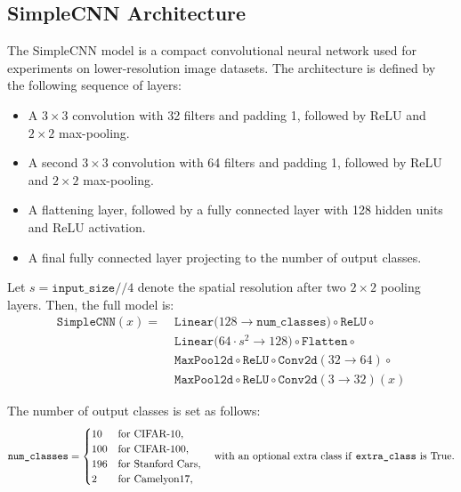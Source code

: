 \subsection{SimpleCNN Architecture}
\label{app:simplecnn}

\noindent
The SimpleCNN model is a compact convolutional neural network used for experiments on lower-resolution image datasets. The architecture is defined by the following sequence of layers:
\begin{itemize}
  \item A $3 \times 3$ convolution with 32 filters and padding 1, followed by ReLU and $2 \times 2$ max-pooling.
  \item A second $3 \times 3$ convolution with 64 filters and padding 1, followed by ReLU and $2 \times 2$ max-pooling.
  \item A flattening layer, followed by a fully connected layer with 128 hidden units and ReLU activation.
  \item A final fully connected layer projecting to the number of output classes.
\end{itemize}

Let \( s = \texttt{input\_size} // 4 \) denote the spatial resolution after two $2\times2$ pooling layers. Then, the full model is:
\[
\begin{aligned}
\texttt{SimpleCNN}(x) =\;&
\texttt{Linear}\big(128 \to \texttt{num\_classes}\big) \circ \texttt{ReLU} \circ \\
&\texttt{Linear}\big(64 \cdot s^2 \to 128\big) \circ \texttt{Flatten} \circ \\
&\texttt{MaxPool2d} \circ \texttt{ReLU} \circ \texttt{Conv2d}(32 \to 64) \circ \\
&\texttt{MaxPool2d} \circ \texttt{ReLU} \circ \texttt{Conv2d}(3 \to 32)(x)
\end{aligned}
\]


\vspace{0.5em}
\noindent
The number of output classes is set as follows:
\[
\texttt{num\_classes} = 
\begin{cases}
10 & \text{for CIFAR-10}, \\
100 & \text{for CIFAR-100}, \\
196 & \text{for Stanford Cars}, \\
2 & \text{for Camelyon17}, \\
\end{cases}
\quad \text{with an optional extra class if \texttt{extra\_class} is True.}
\]

